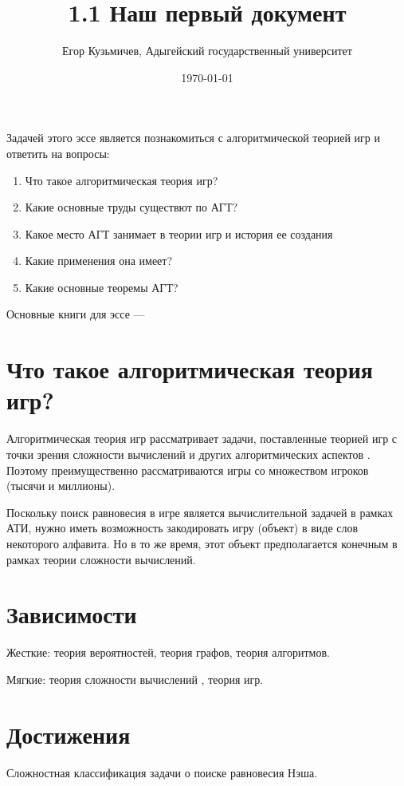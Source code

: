 \documentclass[a4paper,12pt]{article}
\author{Егор Кузьмичев, Адыгейский государственный университет}
\title{1.1 Наш первый документ}
\date{\today}
\begin{document}

\maketitle

Задачей этого эссе является познакомиться с алгоритмической теорией игр и ответить на вопросы:
\begin{enumerate}
\item Что такое алгоритмическая теория игр?
\item Какие основные труды существют по АГТ?
\item Какое место АГТ занимает в теории игр и история ее создания
\item Какие применения она имеет?
\item Какие основные теоремы АГТ?
\end{enumerate}

Основные книги для эссе --- \cite{agt}

\tableofcontents

\section{Что такое алгоритмическая теория игр?}

Алгоритмическая теория игр рассматривает задачи, поставленные теорией игр с точки зрения сложности вычислений и других алгоритмических аспектов \parencite{anons12}.
Поэтому преимущественно рассматриваются игры со множеством игроков (тысячи и миллионы). 

Поскольку поиск равновесия в игре является вычислительной задачей в рамках АТИ, нужно иметь возможность закодировать игру (объект) в виде слов некоторого алфавита. Но в то же время, этот объект предполагается конечным в рамках теории сложности вычислений.


\section{Зависимости}

Жесткие: теория вероятностей, теория графов, теория алгоритмов.

Мягкие: теория сложности вычислений \parencite{compl}, теория игр.

\section{Достижения}

Сложностная классификация задачи о поиске равновесия Нэша.
\end{document}
